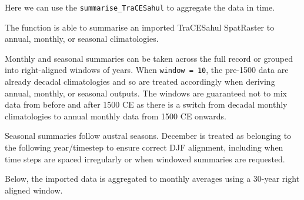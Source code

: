 \documentclass[
]{article}
\newenvironment{Shaded}{\begin{snugshade}}{\end{snugshade}}
\newcommand{\AttributeTok}[1]{\textcolor[rgb]{0.13,0.29,0.53}{#1}}
\newcommand{\DecValTok}[1]{\textcolor[rgb]{0.00,0.00,0.81}{#1}}
\newcommand{\FunctionTok}[1]{\textcolor[rgb]{0.13,0.29,0.53}{\textbf{#1}}}
\newcommand{\NormalTok}[1]{#1}
\newcommand{\OtherTok}[1]{\textcolor[rgb]{0.56,0.35,0.01}{#1}}
\newcommand{\SpecialCharTok}[1]{\textcolor[rgb]{0.81,0.36,0.00}{\textbf{#1}}}
\newcommand{\StringTok}[1]{\textcolor[rgb]{0.31,0.60,0.02}{#1}}
\begin{document}
Here we can use the \texttt{summarise\_TraCESahul} to aggregate the data
in time.

The function is able to summarise an imported TraCESahul SpatRaster to
annual, monthly, or seasonal climatologies.

Monthly and seasonal summaries can be taken across the full record or
grouped into right-aligned windows of years. When
\texttt{window\ =\ 10}, the pre-1500 data are already decadal
climatologies and so are treated accordingly when deriving annual,
monthly, or seasonal outputs. The windows are guaranteed not to mix data
from before and after 1500 CE as there is a switch from decadal monthly
climatologies to annual monthly data from 1500 CE onwards.

Seasonal summaries follow austral seasons. December is treated as
belonging to the following year/timestep to ensure correct DJF
alignment, including when time steps are spaced irregularly or when
windowed summaries are requested.

Below, the imported data is aggregated to monthly averages using a
30-year right aligned window.

\begin{Shaded}
\end{Shaded}
\end{document}
